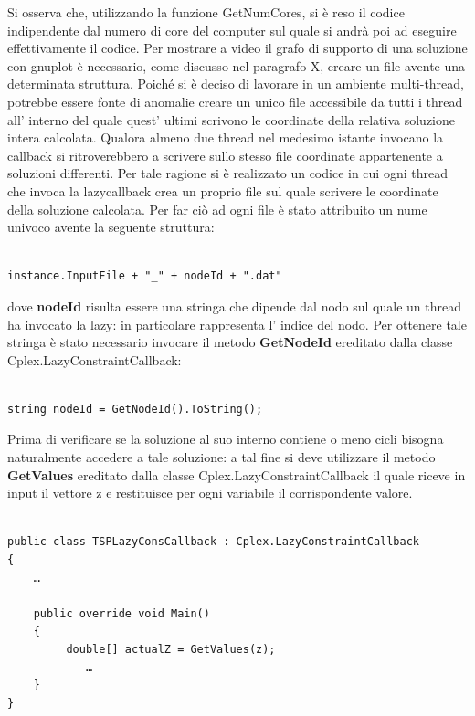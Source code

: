 \documentclass[11pt]{article}
\begin{document}
Si osserva che, utilizzando la funzione GetNumCores, si è reso il codice indipendente dal numero di core del computer sul quale si andrà poi ad eseguire effettivamente il codice.
Per mostrare a video il grafo di supporto di una soluzione con gnuplot è necessario, come discusso nel paragrafo X,  creare un file avente una determinata struttura. Poiché si è deciso di lavorare in un ambiente multi-thread, potrebbe essere fonte di anomalie creare un unico file accessibile da tutti i thread all' interno del quale quest' ultimi scrivono le coordinate della relativa soluzione intera calcolata.  Qualora almeno due thread nel medesimo istante invocano la callback si ritroverebbero a scrivere sullo stesso file coordinate appartenente a soluzioni differenti. 
Per tale ragione si è realizzato un codice in cui ogni thread che invoca la lazycallback crea un proprio file sul quale scrivere le coordinate della soluzione calcolata. Per far ciò ad ogni file è stato attribuito un nume univoco avente la seguente struttura:


\begin{lstlisting}

instance.InputFile + "_" + nodeId + ".dat"

\end{lstlisting}


dove \textbf{nodeId} risulta essere una stringa che dipende dal nodo sul quale un thread ha invocato la lazy: in particolare rappresenta l' indice del nodo. Per ottenere tale stringa è stato necessario invocare il metodo \textbf{GetNodeId} ereditato dalla classe Cplex.LazyConstraintCallback:


\begin{lstlisting}

string nodeId = GetNodeId().ToString();

\end{lstlisting}

Prima di verificare se la soluzione al suo interno contiene o meno cicli bisogna naturalmente accedere a tale soluzione: a tal fine si deve utilizzare il metodo \textbf{GetValues} ereditato dalla classe Cplex.LazyConstraintCallback il quale riceve in input il vettore z e restituisce per ogni variabile il corrispondente valore.


\begin{lstlisting}

public class TSPLazyConsCallback : Cplex.LazyConstraintCallback
{
	…

	public override void Main()
	{
         double[] actualZ = GetValues(z);
    		…
	}
}


\end{lstlisting}
\end{document}
